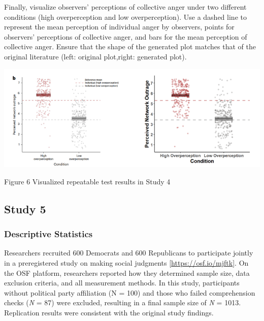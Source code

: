 \documentclass[
  man]{apa6}
\begin{document}
Finally, visualize observers' perceptions of collective anger under two different conditions (high overperception and low overperception). Use a dashed line to represent the mean perception of individual anger by observers, points for observers' perceptions of collective anger, and bars for the mean perception of collective anger. Ensure that the shape of the generated plot matches that of the original literature (left: original plot,right: generated plot).

\begin{center}
\includegraphics{study4_Visualized_Plot.png}
\end{center}
\begin{center}
Figure 6 Visualized repeatable test results in Study 4
\end{center}

\hypertarget{study-5-1}{%
\subsection{Study 5}\label{study-5-1}}

\hypertarget{descriptive-statistics-4}{%
\subsubsection{Descriptive Statistics}\label{descriptive-statistics-4}}

Researchers recruited 600 Democrats and 600 Republicans to participate jointly in a preregistered study on making social judgments {[}\url{https://osf.io/mjftk}{]}. On the OSF platform, researchers reported how they determined sample size, data exclusion criteria, and all measurement methods. In this study, participants without political party affiliation (N = 100) and those who failed comprehension checks (\emph{N} = 87) were excluded, resulting in a final sample size of \emph{N} = 1013. Replication results were consistent with the original study findings.
\end{document}
